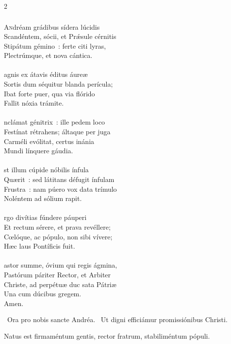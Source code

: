\documentclass[9pt,twoside]{extarticle}
\begin{document}
\begin{multicols}{2}
{\subsubsection*{\center {}}
\lettrine{A}ndréam grádibus sídera lúcidis\\
Scandéntem, sócii, et Prǽsule cérnitis\\
Stipátum gémino~: ferte citi lyras,\\
Plectrúmque, et nova cántica.\\
\\
agnis ex átavis éditus áureæ\\
Sortis dum séquitur blanda perícula;\\
Ibat forte puer, qua via flórido\\
Fallit nóxia trámite.\\
\\
nclámat génitrix~: ille pedem loco\\
Festínat rétrahens; áltaque per juga\\
Carméli evólitat, certus inánia\\
Mundi línquere gáudia.\\
\\
st illum cúpide nóbilis ínfula\\
Quærit~: sed látitans défugit ínfulam\\
Frustra~: nam púero vox data trímulo\\
Noléntem ad sólium rapit.\\
\\
rgo divítias fúndere páuperi\\
Et rectum sérere, et prava revéllere;\\
Cœlóque, ac pópulo, non sibi vívere;\\
Hæc laus Pontíficis fuit.\\
\\
astor summe, óvium qui regis ágmina,\\
Pastórum páriter Rector, et Arbiter\\
Christe, ad perpétuæ duc sata Pátriæ\\
Una cum dúcibus gregem.\\
Amen.

\begin{tightlist}{}
\item {}~Ora pro nobis sancte Andréa. ~Ut digni efficiámur promissiónibus Christi.
\item {} Natus est firmaméntum gentis, rector fratrum, stabiliméntum pópuli.
\end{tightlist}

}
\end{multicols}
\end{document}
